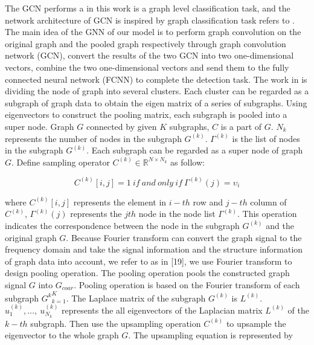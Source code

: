 \documentclass[lettersize,journal]{IEEEtran}
\begin{document}
The GCN performs a in this work is a graph level classification task, and the network architecture of GCN is inspired by graph classification task refers to \cite{19}. The main idea of the GNN of our model is to perform graph convolution on the original graph and the pooled graph respectively through graph convolution network (GCN), convert the results of the two GCN into two one-dimensional vectors, combine the two one-dimensional vectors and send them to the fully connected neural network (FCNN) to complete the detection task. The work in \cite{19} is dividing the  node of graph into several clusters. Each cluster can be regarded as a subgraph of graph data to obtain the eigen matrix of a series of subgraphs. Using eigenvectors to construct the pooling matrix, each subgraph is pooled into a super node.  Graph $G$ connected by given $K$ subgraphs, $C$ is a part of $G$. $N_k$ represents the number of nodes in the subgraph $G^{(k)}$. $\Gamma^{\left(k\right)}$ is the list of nodes in the subgraph $G^{(k)}$. Each subgraph can be regarded as a super node of graph $G$. Define sampling operator $C^{\left(k\right)}\in\mathbb{R}^{N\times N_k}$ as follow:

\begin{equation}
\label{deqn_ex_2}
C^{\left(k\right)}\left[i,j\right]=1\ if\ and\ only\ if\ \Gamma^{\left(k\right)}\left(j\right)=\upsilon_i
\end{equation}

where $C^{\left(k\right)}\left[i,j\right]$ represents the element in $i-th$ row and $j-th$ column of $C^{\left(k\right)}$, $\Gamma^{\left(k\right)}\left(j\right)$ represents the $jth$ node in the node list $\Gamma^{\left(k\right)}$. This operation indicates the correspondence between the node in the subgraph $G^{(k)}$ and the original graph $G$. Because Fourier transform can convert the graph signal to the frequency domain and take the signal information and the structure information of graph data into account, we refer to as in [19], we use Fourier transform to design pooling operation. The pooling operation pools the constructed graph signal $G$ into $G_{coar}$. Pooling operation is based on the Fourier transform of each subgraph ${{G^k}}_{k=1}^K$. The Laplace matrix of the subgraph $G^{(k)}$ is $L^{(k)}$. $u_1^{(k)}, …, {\ u}_{N_k}^{(k)}$ represents the all eigenvectors of the Laplacian matrix $L^{(k)}$ of the $k-th$ subgraph. Then use the upsampling operation $C^{(k)}$ to upsample the eigenvector to the whole graph $G$. The upsampling equation is represented by
\end{document}

